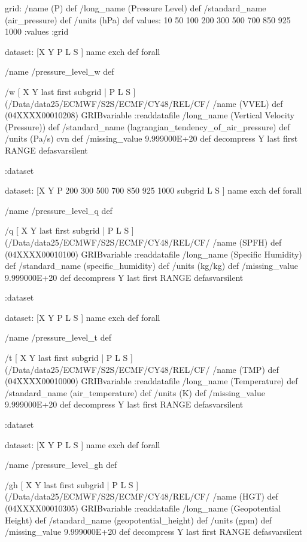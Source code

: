 \begin{ingrid}
{grid:
/name (P) def
/long_name (Pressure Level) def
/standard_name (air_pressure) def
/units (hPa) def
values: 10 50 100 200 300 500 700 850 925 1000 :values
:grid

dataset:
[X Y P L S ] {name exch def } forall

/name /pressure_level_w def

/w { [ X Y last first subgrid | P L S ] (/Data/data25/ECMWF/S2S/ECMF/CY48/REL/CF/%
/name (VVEL) def
(04XXXX00010208) GRIBvariable
:readdatafile
/long_name (Vertical Velocity (Pressure)) def
/standard_name (lagrangian_tendency_of_air_pressure) def
/units (Pa/s) cvn def
/missing_value 9.999000E+20 def
decompress
Y last first RANGE
} defasvarsilent

:dataset

dataset:
[X Y P 200 300 500 700 850 925 1000 subgrid L S ] {name exch def } forall

/name /pressure_level_q def

/q { [ X Y last first subgrid | P L S ] (/Data/data25/ECMWF/S2S/ECMF/CY48/REL/CF/%
/name (SPFH) def
(04XXXX00010100) GRIBvariable
:readdatafile
/long_name (Specific Humidity) def
/standard_name (specific_humidity) def
/units (kg/kg) def
/missing_value 9.999000E+20 def
decompress
Y last first RANGE
} defasvarsilent

:dataset

dataset:
[X Y P L S ] {name exch def } forall

/name /pressure_level_t def

/t { [ X Y last first subgrid | P L S ] (/Data/data25/ECMWF/S2S/ECMF/CY48/REL/CF/%
/name (TMP) def
(04XXXX00010000) GRIBvariable
:readdatafile
/long_name (Temperature) def
/standard_name (air_temperature) def
/units (K) def
/missing_value 9.999000E+20 def
decompress
Y last first RANGE
} defasvarsilent

:dataset

dataset:
[X Y P L S ] {name exch def } forall

/name /pressure_level_gh def

/gh { [ X Y last first subgrid | P L S ] (/Data/data25/ECMWF/S2S/ECMF/CY48/REL/CF/%
/name (HGT) def
(04XXXX00010305) GRIBvariable
:readdatafile
/long_name (Geopotential Height) def
/standard_name (geopotential_height) def
/units (gpm) def
/missing_value 9.999000E+20 def
decompress
Y last first RANGE
} defasvarsilent

}
\end{ingrid}
